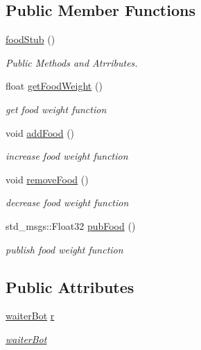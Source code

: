 \subsection*{Public Member Functions}
\begin{DoxyCompactItemize}
\item 
\hyperlink{classfoodStub_a8a60f219fd540ac7c68e46e2bcb98db2}{food\+Stub} ()
\begin{DoxyCompactList}\small\item\em Public Methods and Atrributes. \end{DoxyCompactList}\item 
float \hyperlink{classfoodStub_a5be8738657d5c4dccffc791024524b09}{get\+Food\+Weight} ()
\begin{DoxyCompactList}\small\item\em get food weight function \end{DoxyCompactList}\item 
void \hyperlink{classfoodStub_ae28a11ef20cf122cc9d547a25f34e1c9}{add\+Food} ()
\begin{DoxyCompactList}\small\item\em increase food weight function \end{DoxyCompactList}\item 
void \hyperlink{classfoodStub_ad60120dcd062bc14ba14f1a04bd798db}{remove\+Food} ()
\begin{DoxyCompactList}\small\item\em decrease food weight function \end{DoxyCompactList}\item 
std\+\_\+msgs\+::\+Float32 \hyperlink{classfoodStub_a4436ac50719f58831d6238ec2396764d}{pub\+Food} ()
\begin{DoxyCompactList}\small\item\em publish food weight function \end{DoxyCompactList}\end{DoxyCompactItemize}
\subsection*{Public Attributes}
\begin{DoxyCompactItemize}
\item 
\hyperlink{classwaiterBot}{waiter\+Bot} \hyperlink{classfoodStub_a88a32b2f907a471c65631dfffb24c787}{r}
\begin{DoxyCompactList}\small\item\em \hyperlink{classwaiterBot}{waiter\+Bot} \end{DoxyCompactList}\end{DoxyCompactItemize}


